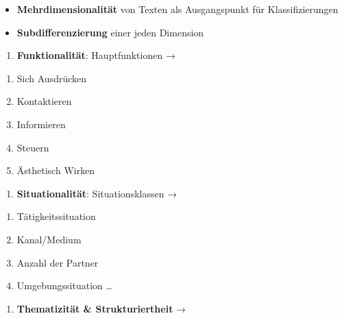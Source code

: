 \documentclass[
  letterpaper,
]{scrbook}
\providecommand{\tightlist}{%
  \setlength{\itemsep}{0pt}\setlength{\parskip}{0pt}}\usepackage{longtable,booktabs,array}
\begin{document}
\begin{itemize}
\item
  \textbf{Mehrdimensionalität} von Texten als Ausgangspunkt für
  Klassifizierungen
\item
  \textbf{Subdifferenzierung} einer jeden Dimension
\end{itemize}

\begin{enumerate}
\def\labelenumi{\arabic{enumi}.}
\tightlist
\item
  \textbf{Funktionalität}: Hauptfunktionen →\\
\end{enumerate}

\begin{enumerate}
\def\labelenumi{\alph{enumi})}
\tightlist
\item
  Sich Ausdrücken\\
\item
  Kontaktieren\\
\item
  Informieren\\
\item
  Steuern\\
\item
  Ästhetisch Wirken\\
\end{enumerate}

\begin{enumerate}
\def\labelenumi{\arabic{enumi}.}
\setcounter{enumi}{1}
\tightlist
\item
  \textbf{Situationalität}: Situationsklassen →\\
\end{enumerate}

\begin{enumerate}
\def\labelenumi{\alph{enumi})}
\tightlist
\item
  Tätigkeitssituation\\
\item
  Kanal/Medium\\
\item
  Anzahl der Partner\\
\item
  Umgebungssituation \ldots{}\\
\end{enumerate}

\begin{enumerate}
\def\labelenumi{\arabic{enumi}.}
\setcounter{enumi}{2}
\tightlist
\item
  \textbf{Thematizität \& Strukturiertheit} →\\
\end{enumerate}
\end{document}
